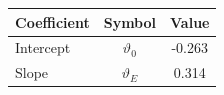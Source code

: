 \begin{tabular}{lcc}
\hline\hline
Coefficient & Symbol & Value \\
\hline
Intercept & $\vartheta_0$ & -0.263 \\
Slope & $\vartheta_E$ & 0.314 \\
\hline
\end{tabular}